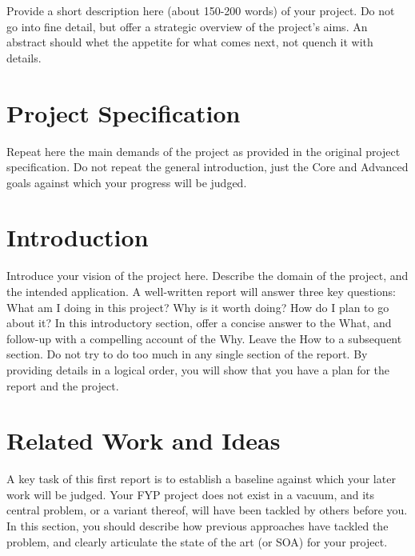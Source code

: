 \documentclass[]{UCD_CS_FYP_Report}
\begin{document}
\maketitle


\tableofcontents


\abstract
Provide a short description here (about 150-200 words) of your project. Do not go into fine detail, but offer a strategic overview of the project’s aims. An abstract should whet the appetite for what comes next, not quench it with details.


\chapter{Project Specification}
Repeat here the main demands of the project as provided in the original project specification. Do not repeat the general introduction, just the Core and Advanced goals against which your progress will be judged. 


\chapter{Introduction}
Introduce your vision of the project here. Describe the domain of the project, and the intended application. A well-written report will answer three key questions: What am I doing in this project? Why is it worth doing? How do I plan to go about it? In this introductory section, offer a concise answer to the What, and follow-up with a compelling account of the Why. Leave the How to a subsequent section. Do not try to do too much in any single section of the report. By providing details in a logical order, you will show that you have a plan for the report and the project.  

\chapter{Related Work and Ideas}
A key task of this first report is to establish a baseline against which your later work will be judged. Your FYP project does not exist in a vacuum, and its central problem, or a variant thereof, will have been tackled by others before you. In this section, you should describe how previous approaches have tackled the problem, and clearly articulate the state of the art (or SOA) for your project.
\end{document}
